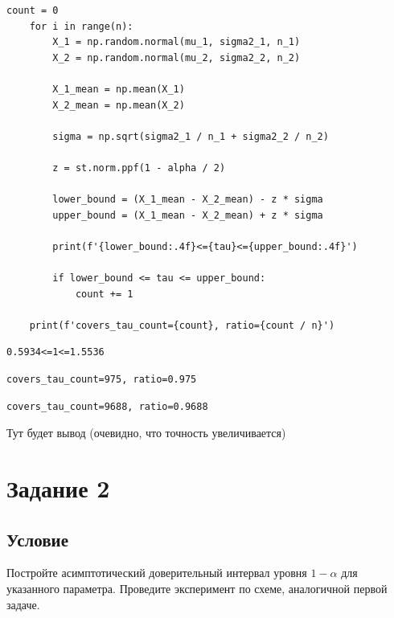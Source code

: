 \documentclass[a4paper, 12pt]{article}
\begin{document}
    \begin{lstlisting}[label=code1, caption={Код для подсчета доверительного интервала и кол-во попаданий}]
    count = 0
    for i in range(n):
        X_1 = np.random.normal(mu_1, sigma2_1, n_1)
        X_2 = np.random.normal(mu_2, sigma2_2, n_2)
        
        X_1_mean = np.mean(X_1)
        X_2_mean = np.mean(X_2)
        
        sigma = np.sqrt(sigma2_1 / n_1 + sigma2_2 / n_2)
        
        z = st.norm.ppf(1 - alpha / 2)
        
        lower_bound = (X_1_mean - X_2_mean) - z * sigma
        upper_bound = (X_1_mean - X_2_mean) + z * sigma

        print(f'{lower_bound:.4f}<={tau}<={upper_bound:.4f}')
            
        if lower_bound <= tau <= upper_bound:
            count += 1
        
    print(f'covers_tau_count={count}, ratio={count / n}')
    \end{lstlisting}


    \begin{lstlisting}[label=res1, caption={Посчитанный доверительный интервал}]
    0.5934<=1<=1.5536
    \end{lstlisting}


    \begin{lstlisting}[label=res1000cov, caption={Покрывает 95-\% для $n=1000$}]
    covers_tau_count=975, ratio=0.975
    \end{lstlisting}


    \begin{lstlisting}[label=res10000cov, caption={Покрывает 95-\% для $n=10000$}]
    covers_tau_count=9688, ratio=0.9688
    \end{lstlisting}


    Тут будет вывод (очевидно, что точность увеличивается)


    \section{Задание 2}
    \subsection{Условие}
    Постройте асимптотический доверительный интервал уровня $1-\alpha$ для указанного параметра.
    Проведите эксперимент по схеме, аналогичной первой задаче.
    
\end{document}
